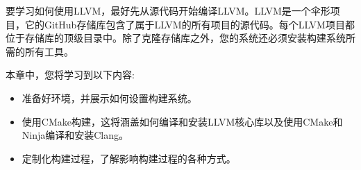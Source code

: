 
要学习如何使用LLVM，最好先从源代码开始编译LLVM。LLVM是一个伞形项目，它的GitHub存储库包含了属于LLVM的所有项目的源代码。每个LLVM项目都位于存储库的顶级目录中。除了克隆存储库之外，您的系统还必须安装构建系统所需的所有工具。\par

本章中，您将学习到以下内容:\par

\begin{itemize}
	\item 准备好环境，并展示如何设置构建系统。
	\item 使用CMake构建，这将涵盖如何编译和安装LLVM核心库以及使用CMake和Ninja编译和安装Clang。
	\item 定制化构建过程，了解影响构建过程的各种方式。
\end{itemize}

\newpage

